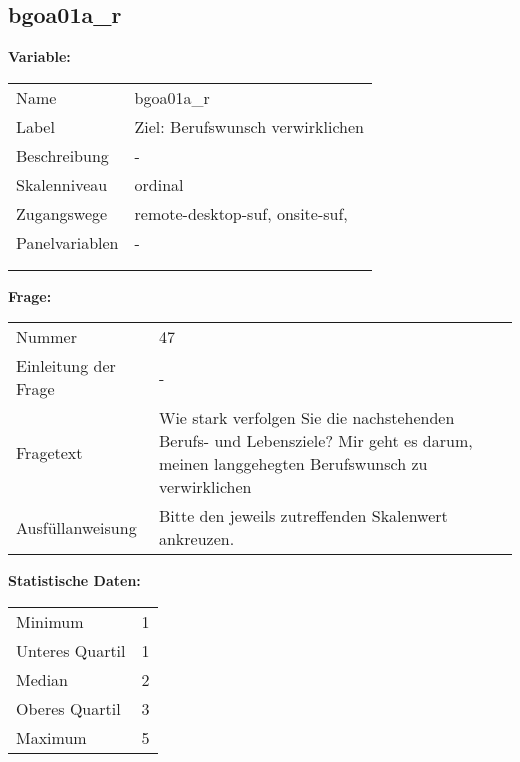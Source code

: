 	
	
	\subsection{bgoa01a\_r}
	\label{subSection:bgoa01a_r}

	\noindent\textbf{Variable:}\\
		\begin{tabular}{lL{11.3cm}}
			\label{tableVariable:bgoa01a_r}
			Name & bgoa01a\_r \\
			Label & Ziel: Berufswunsch verwirklichen \\
			Beschreibung & - \\
			Skalenniveau & ordinal \\
			Zugangswege &
				remote-desktop-suf,
				onsite-suf,
 \\
			Panelvariablen & -
			 \\
			 \\
 \\
		\end{tabular}

		\vspace*{1 cm}
		\noindent\textbf{Frage:}\\
		\begin{tabular}{lL{11.3cm}}
			\label{tableQuestion:bgoa01a_r}
			Nummer & 47 \\
			Einleitung der Frage & - \\
			Fragetext & Wie stark verfolgen Sie die nachstehenden Berufs- und Lebensziele?
Mir geht es darum, meinen langgehegten Berufswunsch zu verwirklichen \\
			Ausfüllanweisung & Bitte den jeweils zutreffenden Skalenwert ankreuzen. \\
		\end{tabular}


		\vspace*{1 cm}
		\noindent\textbf{Statistische Daten:}\\
			\begin{tabular}{ll}
				\label{tableStatistics:bgoa01a_r}
					Minimum & 1 \\
					Unteres Quartil & 1 \\
					Median & 2 \\
					Oberes Quartil & 3 \\
					Maximum & 5 \\
			\end{tabular}



